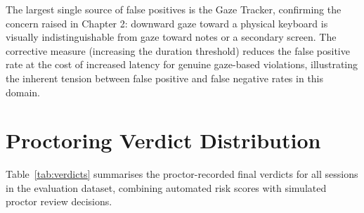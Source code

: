 \begin{table}[htbp]
    \centering
    \caption{False positive alert events on clean sessions in the held-out test set, categorised by triggering agent and environmental cause.}
    \label{tab:fp}
\end{table}

The largest single source of false positives is the Gaze Tracker, confirming the concern raised in Chapter 2: downward gaze toward a physical keyboard is visually indistinguishable from gaze toward notes or a secondary screen. The corrective measure (increasing the duration threshold) reduces the false positive rate at the cost of increased latency for genuine gaze-based violations, illustrating the inherent tension between false positive and false negative rates in this domain.

\section{Proctoring Verdict Distribution}

Table~\ref{tab:verdicts} summarises the proctor-recorded final verdicts for all sessions in the evaluation dataset, combining automated risk scores with simulated proctor review decisions.

